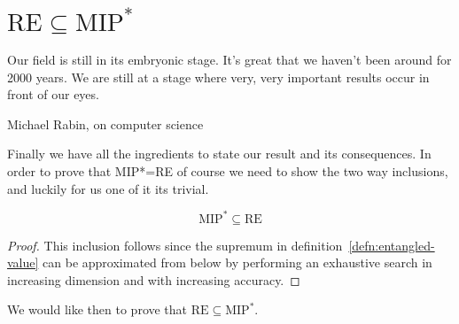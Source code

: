\section{$\text{RE} \subseteq \text{MIP}^*$}
\epigraph{Our field is still in its embryonic stage. It's great that we haven't been around
for 2000 years. We are still at a stage where very, very important results occur
in front of our eyes.}{Michael Rabin, on computer science}

Finally we have all the ingredients to state our result and its consequences.
In order to prove that MIP*=RE of course we need to show the two way inclusions, and luckily for us one of it its trivial.

\begin{theorem}
    \begin{equation}
    \text{MIP}^{*} \subseteq \text{RE} 
    \end{equation}
\end{theorem}
\begin{proof}
    This inclusion follows since the supremum in definition~\ref{defn:entangled-value} can be approximated from below by performing an exhaustive search in increasing dimension and with increasing accuracy.
\end{proof}
We would like then to prove that $\text{RE} \subseteq \text{MIP}^{*}$.
 
